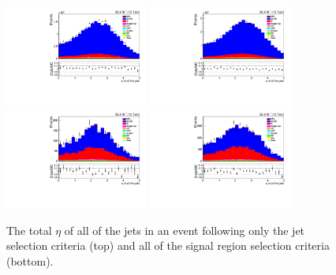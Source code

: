 \begin{figure}[ht]
\centering
\includegraphics[width=0.42\textwidth]{figs/background-estimation/plots/unblinded/prompt_ee_ttbarInc/totalJetEta_NPL_ee_jetSel_ee.pdf}
\includegraphics[width=0.42\textwidth]{figs/background-estimation/plots/unblinded/prompt_mumu_ttbarInc/totalJetEta_NPL_mumu_jetSel_mumu.pdf}
\\
\includegraphics[width=0.42\textwidth]{figs/background-estimation/plots/unblinded/prompt_ee_ttbarInc/totalJetEta_NPL_ee_wMass_ee.pdf}
\includegraphics[width=0.42\textwidth]{figs/background-estimation/plots/unblinded/prompt_mumu_ttbarInc/totalJetEta_NPL_mumu_wMass_mumu.pdf}
\caption{
The total $\eta$ of all of the jets in an event following only the jet selection criteria (top) and all of the signal region selection criteria (bottom).
}
\label{fig:SR_totalJetEta}
\end{figure}

